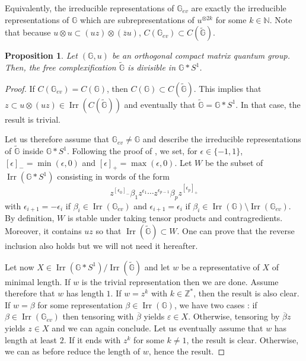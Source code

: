 \documentclass[a4paper, 11pt]{amsart}
\theoremstyle{plain}
\newtheorem{prop}[thm]{Proposition}
\theoremstyle{definition}
\theoremstyle{remark}
\DeclareMathOperator{\Irr}{Irr}
\newcommand{\G}{\mathbb{G}}
\newcommand{\N}{\mathbb{N}}
\newcommand{\Z}{\mathbb{Z}}
\begin{document}
Equivalently, the irreducible representations of $\G_{ev}$ are exactly the irreducible representations of $\G$ which are subrepresentations of $u^{\otimes 2k}$ for some $k\in\N$. Note that because $u\otimes u\subset (uz)\otimes (\overline{z}u)$, $C(\G_{ev})\subset C(\widetilde{\G})$.

\begin{prop}\label{prop:divisiblefreecomplexification}
Let $(\G, u)$ be an orthogonal compact matrix quantum group. Then, the free complexification $\widetilde{\G}$ is divisible in $\G\ast S^{1}$.
\end{prop}

\begin{proof}
If $C(\G_{ev}) = C(\G)$, then $C(\G)\subset C(\widetilde{\G})$. This implies that $z\subset u\otimes (uz)\in \Irr(C(\widetilde{\G}))$ and eventually that $\widetilde{\G} = \G\ast S^{1}$. In that case, the result is trivial.

Let us therefore assume that $\G_{ev}\neq \G$ and describe the irreducible representations of $\widetilde{\G}$ inside $\G\ast S^{1}$. Following the proof of \cite[Prop 4.3]{vergnioux2013k}, we set, for $\epsilon\in \{-1, 1\}$, $[\epsilon]_{-} = \min(\epsilon, 0)$ and $[\epsilon]_{+} = \max(\epsilon, 0)$. Let $W$ be the subset of $\Irr(\G\ast S^{1})$ consisting in words of the form
\begin{equation*}
z^{[\epsilon_{0}]_{-}}\beta_{1}z^{\epsilon_{1}}\cdots z^{\epsilon_{p-1}}\beta_{p}z^{[\epsilon_{p}]_{+}}
\end{equation*}
with $\epsilon_{i+1} = -\epsilon_{i}$ if $\beta_{i}\in\Irr(\G_{ev})$ and $\epsilon_{i+1} = \epsilon_{i}$ if $\beta_{i}\in \Irr(\G)\setminus\Irr(\G_{ev})$. By definition, $W$ is stable under taking tensor products and contragredients. Moreover, it contains $uz$ so that $\Irr(\widetilde{\G})\subset W$. One can prove that the reverse inclusion also holds but we will not need it hereafter.

Let now $X\in \Irr(\G\ast S^{1})/\Irr(\widetilde{\G})$ and let $w$ be a representative of $X$ of minimal length. If $w$ is the trivial representation then we are done. Assume therefore that $w$ has length $1$. If $w=z^{k}$ with $k\in \Z^{*}$, then the result is also clear. If $w=\beta$ for some representation $\beta\in \Irr(\G)$, we have two cases : if $\beta\in \Irr(\G_{ev})$ then tensoring with $\overline{\beta}$ yields $\varepsilon\in X$. Otherwise, tensoring by $\overline{\beta}z$ yields $z\in X$ and we can again conclude. Let us eventually assume that $w$ has length at least $2$. If it ends with $z^{k}$ for some $k\neq 1$, the result is clear. Otherwise, we can as before reduce the length of $w$, hence the result.
\end{proof}
\end{document}
